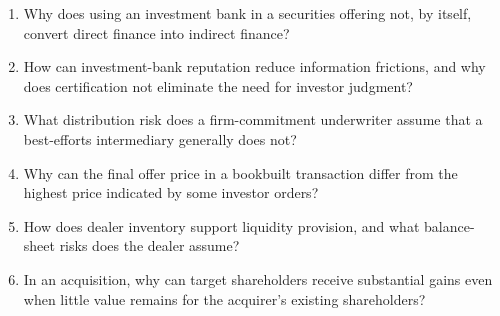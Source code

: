 \begin{enumerate}

\item Why does using an investment bank in a securities offering not, by itself, convert direct finance into indirect finance?

\item How can investment-bank reputation reduce information frictions, and why does certification not eliminate the need for investor judgment?

\item What distribution risk does a firm-commitment underwriter assume that a best-efforts intermediary generally does not?

\item Why can the final offer price in a bookbuilt transaction differ from the highest price indicated by some investor orders?

\item How does dealer inventory support liquidity provision, and what balance-sheet risks does the dealer assume?

\item In an acquisition, why can target shareholders receive substantial gains even when little value remains for the acquirer's existing shareholders?

\end{enumerate}



